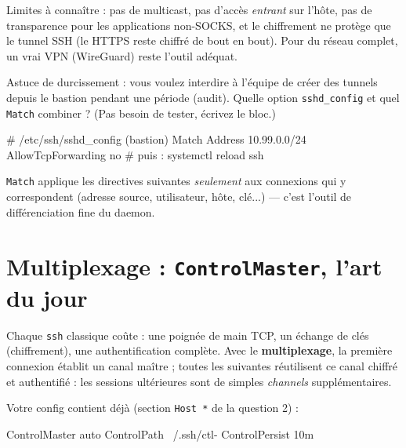 \documentclass[a4paper,10pt]{exam}
\begin{document}
\begin{questions}
\begin{solution}
Limites à connaître : pas de multicast, pas d'accès \emph{entrant} sur l'hôte, pas de
transparence pour les applications non-SOCKS, et le chiffrement ne protège que le tunnel
SSH (le HTTPS reste chiffré de bout en bout). Pour du réseau complet, un vrai VPN
(WireGuard) reste l'outil adéquat.
\end{solution}
\question Astuce de durcissement : vous voulez interdire à l'équipe de créer des tunnels
depuis le bastion pendant une période (audit). Quelle option \texttt{sshd\_config} et quel
\texttt{Match} combiner ? (Pas besoin de tester, écrivez le bloc.)
\begin{solution}
\begin{bashcode}
# /etc/ssh/sshd_config (bastion)
Match Address 10.99.0.0/24
    AllowTcpForwarding no
# puis :
systemctl reload ssh
\end{bashcode}
\texttt{Match} applique les directives suivantes \emph{seulement} aux connexions qui y
correspondent (adresse source, utilisateur, hôte, clé...) — c'est l'outil de
différenciation fine du daemon.
\end{solution}
\end{questions}

\section{Multiplexage : \texttt{ControlMaster}, l'art du jour}

Chaque \texttt{ssh} classique coûte : une poignée de main TCP, un échange de clés
(chiffrement), une authentification complète. Avec le \textbf{multiplexage}, la première
connexion établit un canal maître ; toutes les suivantes réutilisent ce canal chiffré et
authentifié : les sessions ultérieures sont de simples \emph{channels} supplémentaires.

Votre config contient déjà (section \texttt{Host *} de la question 2) :
\begin{bashcode}
ControlMaster auto
ControlPath ~/.ssh/ctl-%
ControlPersist 10m
\end{bashcode}
\end{document}
